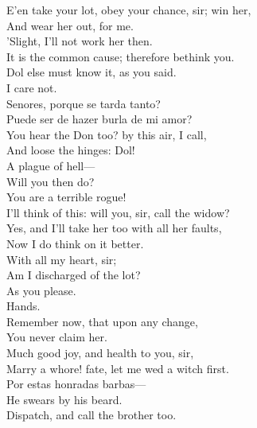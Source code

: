 \documentclass[a4paper,oneside,12pt]{memoir}
\begin{document}
\begin{drama*}
E'en take your lot, obey your chance, sir; win her,\\
And wear her out, for me.\\
\subtlespeaks {} 'Slight, I'll not work her then.\\
\facespeaks It is the common cause; therefore bethink you.\\
Dol else must know it, as you said.\\
\subtlespeaks {} I care not.\\
\surlyspeaks Senores, porque se tarda tanto?\\
Puede ser de hazer burla de mi amor?\\
\facespeaks You hear the Don too? by this air, I call,\\
And loose the hinges: Dol!\\
\subtlespeaks {} A plague of hell---\\
\facespeaks Will you then do?\\
\subtlespeaks {} You are a terrible rogue!\\
I'll think of this: will you, sir, call the widow?\\
\facespeaks Yes, and I'll take her too with all her faults,\\
Now I do think on it better.\\
\subtlespeaks {} With all my heart, sir;\\
Am I discharged of the lot?\\
\facespeaks {} As you please.\\
\subtlespeaks {} Hands.\\
\facespeaks Remember now, that upon any change,\\
You never claim her.\\
\subtlespeaks {} Much good joy, and health to you, sir,\\
Marry a whore! fate, let me wed a witch first.\\
\surlyspeaks Por estas honradas barbas---\\
\subtlespeaks {} He swears by his beard.\\
Dispatch, and call the brother too.\\

\end{drama*}
\end{document}
